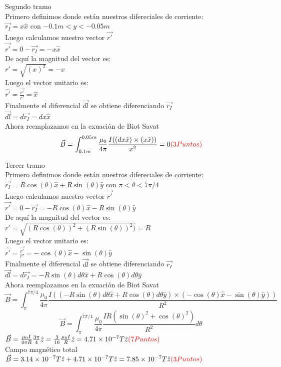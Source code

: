 \documentclass[letterpaper,11pt]{article}
\begin{document}
Segundo tramo\\

Primero definimos donde están nuestros difereciales de corriente:\\
$\vec{r_I}=x\hat{x}$ con $-0.1m<y<-0.05m$\\
Luego calculamos nuestro vector $\vec{r'}$\\
$\vec{r'}=0-\vec{r_I}=-x\hat{x}$\\
De aquí la magnitud del vector es:\\
$r'=\sqrt{(x)^2}=-x$\\
Luego el vector unitario es:\\
$\hat{r'}=\frac{\vec{r'}}{r'}=\hat{x}$\\
Finalmente el diferencial $\vec{dl}$ se obtiene diferenciando $\vec{r_I}$\\
$\vec{dl}=d\vec{r_I}=dx\hat{x}$\\
Ahora reemplazamos en la exuación de Biot Savat\\
\begin{equation*}
\vec{B}=\int_{0.1m}^{0.05m} \frac{\mu_0}{4\pi} \frac{I((dx\hat{x})\times(x\hat{x}))}{x^2}=0  \textcolor{red}{(3 Puntos)}
\end{equation*}

Tercer tramo\\

Primero definimos donde están nuestros difereciales de corriente:\\
$\vec{r_I}=R\cos(\theta)\hat{x}+R\sin(\theta)\hat{y}$ con $\pi<\theta<7\pi/4$\\
Luego calculamos nuestro vector $\vec{r'}$\\
$\vec{r'}=0-\vec{r_I}=-R\cos(\theta)\hat{x}-R\sin(\theta)\hat{y}$\\
De aquí la magnitud del vector es:\\
$r'=\sqrt{(R\cos(\theta))^2+(R\sin(\theta))^2)}=R$\\
Luego el vector unitario es:\\
$\hat{r'}=\frac{\vec{r'}}{r'}=-\cos(\theta)\hat{x}-\sin(\theta)\hat{y}$\\
Finalmente el diferencial $\vec{dl}$ se obtiene diferenciando $\vec{r_I}$\\
$\vec{dl}=d\vec{r_I}=-R\sin(\theta)d\theta\hat{x}+R\cos(\theta)d\theta\hat{y}$\\
Ahora reemplazamos en la exuación de Biot Savat\\
\begin{equation*}
\vec{B}=\int_{\pi}^{7\pi/4} \frac{\mu_0}{4\pi} \frac{I((-R\sin(\theta)d\theta\hat{x}+R\cos(\theta)d\theta\hat{y})\times(-\cos(\theta)\hat{x}-\sin(\theta)\hat{y}))}{R^2}
\end{equation*}
\begin{equation*}
\vec{B}=\int_{\pi}^{7\pi/4} \frac{\mu_0}{4\pi} \frac{IR(\sin(\theta)^2+\cos(\theta)^2)}{R^2}d\theta
\end{equation*}
$\vec{B}=\frac{\mu_0 I}{4\pi R} \frac{3\pi}{4} \hat{z}=\frac{3}{16}\frac{\mu_0 I}{R}\hat{z}=4.71\times 10^{-7} T \hat{z} \textcolor{red}{(7 Puntos)}$\\

Campo magnético total\\

$\vec{B}=3.14\times 10^{-7} T \hat{z} + 4.71\times 10^{-7} T \hat{z}=7.85\times 10^{-7} T \hat{z} \textcolor{red}{(3 Puntos)}$
\end{document}
